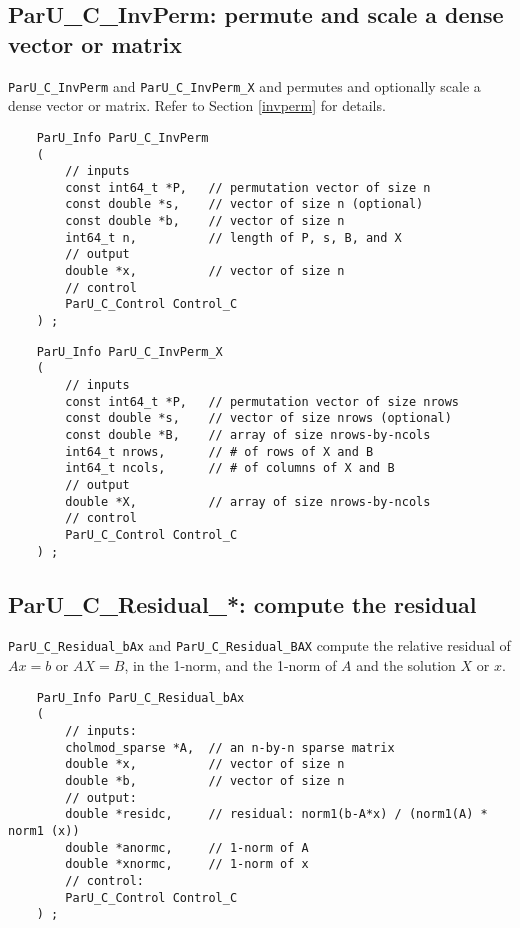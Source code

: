 \documentclass[12pt]{article}
\begin{document}
\subsection{{\sf ParU\_C\_InvPerm}: permute and scale a dense vector or matrix}

    \verb'ParU_C_InvPerm' and \verb'ParU_C_InvPerm_X' and permutes and
    optionally scale a dense vector or matrix.  Refer to Section \ref{invperm}
    for details.

    {\footnotesize
    \begin{verbatim}
    ParU_Info ParU_C_InvPerm
    (
        // inputs
        const int64_t *P,   // permutation vector of size n
        const double *s,    // vector of size n (optional)
        const double *b,    // vector of size n
        int64_t n,          // length of P, s, B, and X
        // output
        double *x,          // vector of size n
        // control
        ParU_C_Control Control_C
    ) ; \end{verbatim} }

    {\footnotesize
    \begin{verbatim}
    ParU_Info ParU_C_InvPerm_X
    (
        // inputs
        const int64_t *P,   // permutation vector of size nrows
        const double *s,    // vector of size nrows (optional)
        const double *B,    // array of size nrows-by-ncols
        int64_t nrows,      // # of rows of X and B
        int64_t ncols,      // # of columns of X and B
        // output
        double *X,          // array of size nrows-by-ncols
        // control
        ParU_C_Control Control_C
    ) ; \end{verbatim} }

\subsection{{\sf ParU\_C\_Residual\_*}: compute the residual}

    \verb'ParU_C_Residual_bAx' and \verb'ParU_C_Residual_BAX' compute the
    relative residual of $Ax=b$ or $AX=B$, in the 1-norm, and the 1-norm of $A$
    and the solution $X$ or $x$.

    {\footnotesize
    \begin{verbatim}
    ParU_Info ParU_C_Residual_bAx
    (
        // inputs:
        cholmod_sparse *A,  // an n-by-n sparse matrix
        double *x,          // vector of size n
        double *b,          // vector of size n
        // output:
        double *residc,     // residual: norm1(b-A*x) / (norm1(A) * norm1 (x))
        double *anormc,     // 1-norm of A
        double *xnormc,     // 1-norm of x
        // control:
        ParU_C_Control Control_C
    ) ; \end{verbatim} }
\end{document}
